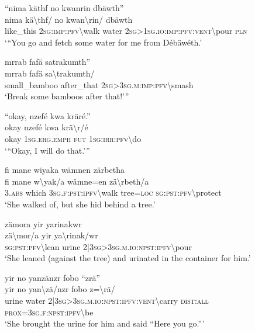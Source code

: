 \ea\label{ex:8:a1729}
``nima käthf no kwanrin dbäwth''\\
\gll nima	kä{\textbackslash}thf/	no	kwan{\textbackslash}rin/	dbäwth\\
     like\_this	2\textsc{sg}:\textsc{imp}:\textsc{pfv}{\textbackslash}walk	water	2\textsc{sg}>1\textsc{sg}.\textsc{io}:\textsc{imp}:\textsc{pfv}:\textsc{vent}{\textbackslash}pour	\textsc{pln}\\
\glt `{``}You go and fetch some water for me from Débäwéth.'
\z

\newpage
\ea\label{ex:8:a1730}
mrrab fafä satrakumth''\\
\gll mrrab	fafä	sa{\textbackslash}trakumth/\\
     small\_bamboo	after\_that	2\textsc{sg}>3\textsc{sg}.\textsc{m}:\textsc{imp}:\textsc{pfv}{\textbackslash}smash\\
\glt `Break some bamboos after that!'''
\z

\ea\label{ex:8:a1731}
``okay, nzefé kwa kräré.''\\
\gll okay	nzefé	kwa	krä{\textbackslash}r/é\\
     okay	1\textsc{sg}.\textsc{erg}.\textsc{emph}	\textsc{fut}	1\textsc{sg}:\textsc{irr}:\textsc{pfv}{\textbackslash}do\\
\glt `{``}Okay, I will do that.'''
\z

\ea\label{ex:8:a1732}
fi mane wiyaka wämnen zärbetha\\
\gll fi	mane	w{\textbackslash}yak/a	wämne=en	zä{\textbackslash}rbeth/a\\
     3.\textsc{abs}	which	3\textsc{sg}.\textsc{f}:\textsc{pst}:\textsc{ipfv}{\textbackslash}walk	tree=\textsc{loc}	\textsc{sg}:\textsc{pst}:\textsc{pfv}{\textbackslash}protect\\
\glt `She walked of, but she hid behind a tree.'
\z

\ea\label{ex:8:a1733}
zämora yir yarinakwr\\
\gll zä{\textbackslash}mor/a	yir	ya{\textbackslash}rinak/wr\\
     \textsc{sg}:\textsc{pst}:\textsc{pfv}{\textbackslash}lean	urine	2|3\textsc{sg}>3\textsc{sg}.\textsc{m}.\textsc{io}:\textsc{npst}:\textsc{ipfv}{\textbackslash}pour\\
\glt `She leaned (against the tree) and urinated in the container for him.'
\z

\ea\label{ex:8:a1735}
yir no yanzänzr fobo ``zrä''\\
\gll yir	no	yan{\textbackslash}zä/nzr	fobo	z={\textbackslash}rä/\\
     urine	water	2|3\textsc{sg}>3\textsc{sg}.\textsc{m}.\textsc{io}:\textsc{npst}:\textsc{ipfv}:\textsc{vent}{\textbackslash}carry	\textsc{dist}:\textsc{all}	\textsc{prox}=3\textsc{sg}.\textsc{f}:\textsc{npst}:\textsc{ipfv}{\textbackslash}be\\
\glt `She brought the urine for him and said ``Here you go.'''
\z

